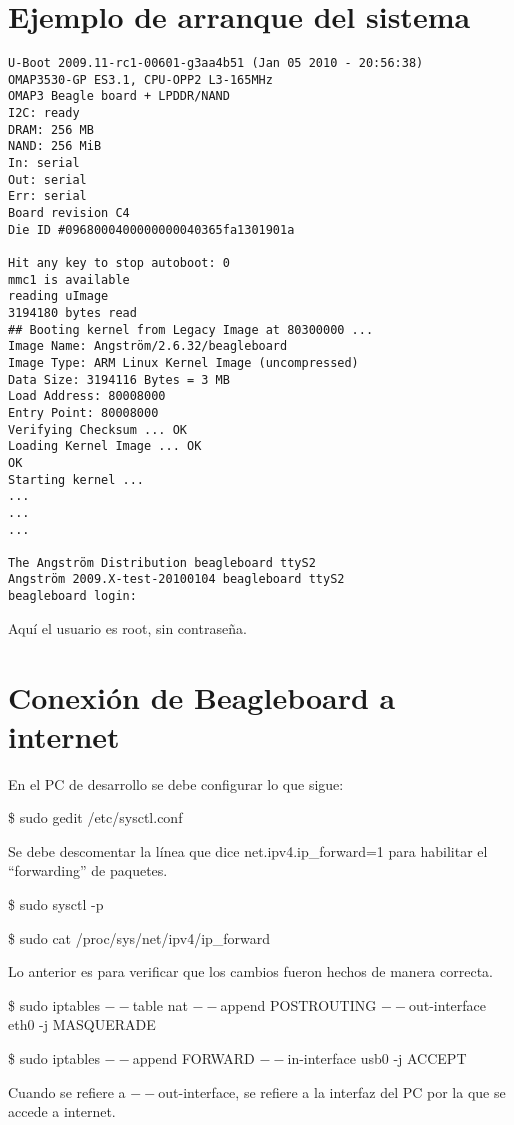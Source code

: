 \section{Ejemplo de arranque del sistema}\label{arr}

\begin{verbatim}
U-Boot 2009.11-rc1-00601-g3aa4b51 (Jan 05 2010 - 20:56:38) 
OMAP3530-GP ES3.1, CPU-OPP2 L3-165MHz 
OMAP3 Beagle board + LPDDR/NAND 
I2C: ready 
DRAM: 256 MB 
NAND: 256 MiB 
In: serial 
Out: serial 
Err: serial 
Board revision C4 
Die ID #0968000400000000040365fa1301901a 

Hit any key to stop autoboot: 0 
mmc1 is available 
reading uImage 
3194180 bytes read 
## Booting kernel from Legacy Image at 80300000 ... 
Image Name: Angström/2.6.32/beagleboard 
Image Type: ARM Linux Kernel Image (uncompressed) 
Data Size: 3194116 Bytes = 3 MB 
Load Address: 80008000 
Entry Point: 80008000 
Verifying Checksum ... OK 
Loading Kernel Image ... OK 
OK 
Starting kernel ... 
... 
... 
... 

The Angström Distribution beagleboard ttyS2 
Angström 2009.X-test-20100104 beagleboard ttyS2 
beagleboard login: 
\end{verbatim}

Aquí el usuario es root, sin contraseña.



\section{Conexión de Beagleboard a internet}\label{BbInternet}

\bigskip
En el PC de desarrollo se debe configurar lo que sigue:

\bigskip
\centerline{\$ sudo gedit /etc/sysctl.conf}

Se debe descomentar la línea que dice net.ipv4.ip\_forward=1 para habilitar el “forwarding” de paquetes.

\bigskip
\centerline{\$ sudo sysctl -p}

\centerline{\$ sudo cat /proc/sys/net/ipv4/ip\_forward}

Lo anterior es para verificar que los cambios fueron hechos de manera correcta.

\bigskip
\centerline{\$ sudo iptables $--$table nat $--$append POSTROUTING $--$out-interface eth0 -j  MASQUERADE}

\centerline{\$ sudo iptables $--$append FORWARD $--$in-interface usb0 -j ACCEPT}

Cuando se refiere a $--$out-interface, se refiere a la interfaz del PC por la que se accede a internet.




